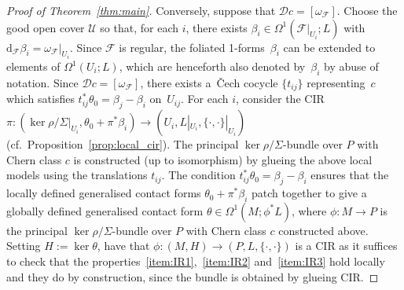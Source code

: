 \documentclass[10pt,a4paper]{amsart}
\numberwithin{equation}{section}
\newcommand{\de}{\mathrm{d}} %
\newcommand{\JM}{(P,L,\{\cdot,\cdot\})} %
\newcommand{\CM}{(M,H)} %
\begin{document}
\begin{proof}[Proof of Theorem~\ref{thm:main}]
Conversely, suppose that $\mathcal{D}c = [\omega_{\mathcal{F}}]$. Choose the good open cover $\mathcal{U}$ so that, for each $i$, there exists $\beta_i \in \Omega^1(\mathcal{F}|_{U_i};L)$ with $\de_{\mathcal{F}}\beta_i = \omega_{\mathcal{F}}|_{U_i}$. Since $\mathcal{F}$ is regular, the foliated 1-forms~$\beta_i$ can be extended to elements of $\Omega^1(U_i;L)$, which are henceforth also denoted by~$\beta_i$ by abuse of notation. Since $\mathcal{D}c = [\omega_{\mathcal{F}}]$, there exists a~\v{C}ech cocycle $\{t_{ij}\}$ representing~$c$ which satisf\/ies $t_{ij}^* \theta_0 = \beta_j - \beta_i$ on~$U_{ij}$. For each $i$, consider the CIR $\pi \colon (\ker \rho/\Sigma|_{U_i},\theta_0 + \pi^*\beta_i) \to (U_i,L|_{U_i}, \{\cdot,\cdot\}|_{U_i})$ (cf.\ Proposition~\ref{prop:local_cir}). The principal $\ker \rho/\Sigma$-bundle over $P$ with Chern class $c$ is constructed (up to isomorphism) by glueing the above local models using the translations $t_{ij}$. The condition $t_{ij}^* \theta_0 = \beta_j - \beta_i$ ensures that the locally def\/ined generalised contact forms $\theta_0 + \pi^*\beta_i$ patch together to give a globally def\/ined generalised contact form $\theta \in \Omega^1(M;\phi^* L)$, where $\phi \colon M \to P$ is the principal $\ker \rho/\Sigma$-bundle over $P$ with Chern class $c$ constructed above. Setting $H := \ker \theta$, have that $\phi\colon \CM \to \JM$ is a CIR as it suf\/f\/ices to check that the properties~\ref{item:IR1},~\ref{item:IR2} and~\ref{item:IR3} hold locally and they do by construction, since the bundle is obtained by glueing CIR.


\end{proof}
\end{document}
